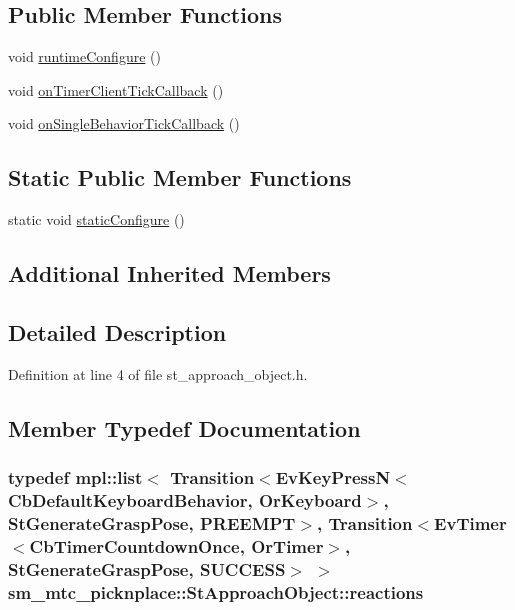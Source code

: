 \subsection*{Public Member Functions}
\begin{DoxyCompactItemize}
\item 
void \hyperlink{structsm__mtc__picknplace_1_1StApproachObject_a4f214c483a0a4f6425787700fec46f2f}{runtime\+Configure} ()
\item 
void \hyperlink{structsm__mtc__picknplace_1_1StApproachObject_a782b8ba006150f36c2e7e58c938a555e}{on\+Timer\+Client\+Tick\+Callback} ()
\item 
void \hyperlink{structsm__mtc__picknplace_1_1StApproachObject_ab9d80cae28bbca602d73caf2045820a0}{on\+Single\+Behavior\+Tick\+Callback} ()
\end{DoxyCompactItemize}
\subsection*{Static Public Member Functions}
\begin{DoxyCompactItemize}
\item 
static void \hyperlink{structsm__mtc__picknplace_1_1StApproachObject_af4be0424aa096166d80d45c4b9e78719}{static\+Configure} ()
\end{DoxyCompactItemize}
\subsection*{Additional Inherited Members}


\subsection{Detailed Description}


Definition at line 4 of file st\+\_\+approach\+\_\+object.\+h.



\subsection{Member Typedef Documentation}
\subsubsection[{\texorpdfstring{reactions}{reactions}}]{\setlength{\rightskip}{0pt plus 5cm}typedef mpl\+::list$<$ Transition$<$Ev\+Key\+PressN$<$Cb\+Default\+Keyboard\+Behavior, {\bf Or\+Keyboard}$>$, {\bf St\+Generate\+Grasp\+Pose}, {\bf P\+R\+E\+E\+M\+PT}$>$, Transition$<$Ev\+Timer$<$Cb\+Timer\+Countdown\+Once, {\bf Or\+Timer}$>$, {\bf St\+Generate\+Grasp\+Pose}, {\bf S\+U\+C\+C\+E\+SS}$>$ $>$ {\bf sm\+\_\+mtc\+\_\+picknplace\+::\+St\+Approach\+Object\+::reactions}}\hypertarget{structsm__mtc__picknplace_1_1StApproachObject_a9828fec00f78add92fa9cdbdeb14a0c9}{}\label{structsm__mtc__picknplace_1_1StApproachObject_a9828fec00f78add92fa9cdbdeb14a0c9}


